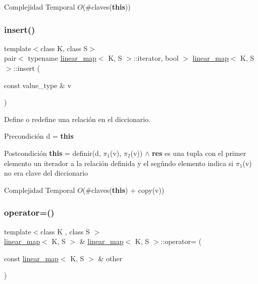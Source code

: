 \begin{DoxyDescription}
\item[Complejidad Temporal]$O$(\#claves({\bfseries this}))
\end{DoxyDescription}\mbox{\label{classlinear__map_a3631b2f824bbf4489943f0816464068e}} 
\subsubsection{\texorpdfstring{insert()}{insert()}}
{\footnotesize\ttfamily template$<$class K, class S$>$ \\
pair$<$ typename \mbox{\hyperlink{classlinear__map}{linear\+\_\+map}}$<$ K, S $>$\+::iterator, bool $>$ \mbox{\hyperlink{classlinear__map}{linear\+\_\+map}}$<$ K, S $>$\+::insert (\begin{DoxyParamCaption}\item[{const value\+\_\+type \&}]{v }\end{DoxyParamCaption})}



Define o redefine una relación en el diccionario. 

\begin{DoxyPrecond}{Precondición}
d = {\bfseries this} 
\end{DoxyPrecond}
\begin{DoxyPostcond}{Postcondición}
{\bfseries this} = definir(d, $\pi_1$(v), $\pi_2$(v)) $\land$ {\bfseries res} es una tupla con el primer elemento un iterador a la relación definida y el segúndo elemento indica si $\pi_1$(v) no era clave del diccionario
\end{DoxyPostcond}

\begin{DoxyDescription}
\item[Complejidad Temporal]$O$(\#claves({\bfseries this}) + copy(v))
\end{DoxyDescription}\mbox{\label{classlinear__map_a9868e2ada8b775c57521506fe7dd24a7}} 
\subsubsection{\texorpdfstring{operator=()}{operator=()}}
{\footnotesize\ttfamily template$<$class K , class S $>$ \\
\mbox{\hyperlink{classlinear__map}{linear\+\_\+map}}$<$ K, S $>$ \& \mbox{\hyperlink{classlinear__map}{linear\+\_\+map}}$<$ K, S $>$\+::operator= (\begin{DoxyParamCaption}\item[{const \mbox{\hyperlink{classlinear__map}{linear\+\_\+map}}$<$ K, S $>$ \&}]{other }\end{DoxyParamCaption})}



